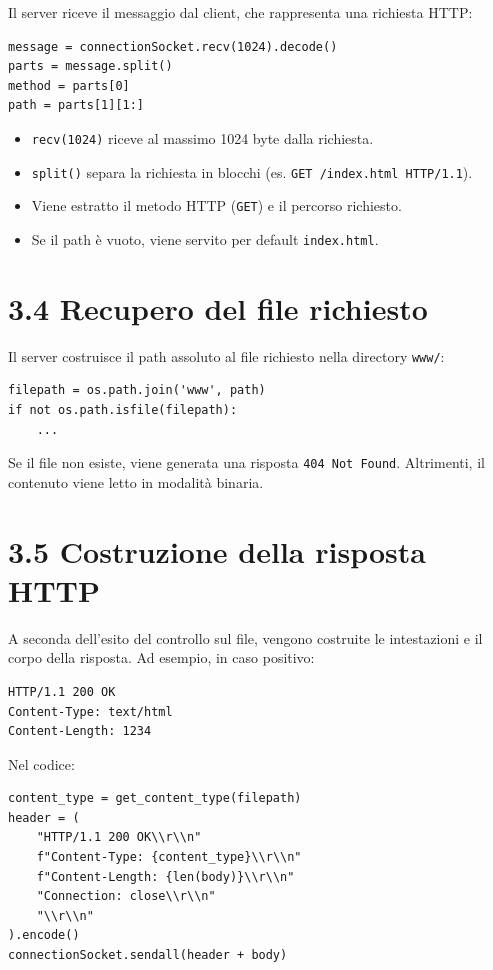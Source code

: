 \documentclass[a4paper,12pt]{report}
\begin{document}
Il server riceve il messaggio dal client, che rappresenta una richiesta HTTP:

\begin{verbatim}
message = connectionSocket.recv(1024).decode()
parts = message.split()
method = parts[0]
path = parts[1][1:]
\end{verbatim}

\begin{itemize}
    \item \texttt{recv(1024)} riceve al massimo 1024 byte dalla richiesta.
    \item \texttt{split()} separa la richiesta in blocchi (es. \texttt{GET /index.html HTTP/1.1}).
    \item Viene estratto il metodo HTTP (\texttt{GET}) e il percorso richiesto.
    \item Se il path è vuoto, viene servito per default \texttt{index.html}.
\end{itemize}


\section{3.4 Recupero del file richiesto}

Il server costruisce il path assoluto al file richiesto nella directory \texttt{www/}:

\begin{verbatim}
filepath = os.path.join('www', path)
if not os.path.isfile(filepath):
    ...
\end{verbatim}

Se il file non esiste, viene generata una risposta \texttt{404 Not Found}. Altrimenti, il contenuto viene letto in modalità binaria.


\section{3.5 Costruzione della risposta HTTP}

A seconda dell’esito del controllo sul file, vengono costruite le intestazioni e il corpo della risposta. Ad esempio, in caso positivo:

\begin{verbatim}
HTTP/1.1 200 OK
Content-Type: text/html
Content-Length: 1234
\end{verbatim}

Nel codice:

\begin{verbatim}
content_type = get_content_type(filepath)
header = (
    "HTTP/1.1 200 OK\\r\\n"
    f"Content-Type: {content_type}\\r\\n"
    f"Content-Length: {len(body)}\\r\\n"
    "Connection: close\\r\\n"
    "\\r\\n"
).encode()
connectionSocket.sendall(header + body)
\end{verbatim}
\end{document}
